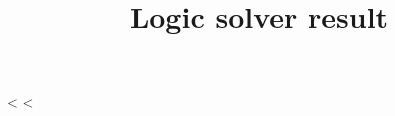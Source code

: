 \documentclass[a4paper,twoside=false,DIV=16]{scrartcl}
\title{Logic solver result}
\begin{document}
\maketitle

<%
<%
\end{document}
